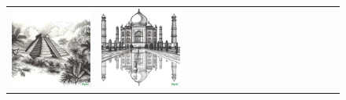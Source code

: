 \begin{figure}[ht!]
\begin{adjustwidth}{-0.8in}{-0.5in}
\begin{tabular}{cccccccccccccccccccc}
\multicolumn{3}{c}{\includegraphics[width=\twobytwocolwidth\textwidth]{figures/cherries/charcoal_pyramid.jpg}} &
\multicolumn{3}{c}{\includegraphics[width=\twobytwocolwidth\textwidth]{figures/cherries/charcoal_taj_mahal.jpg}} \\

\end{tabular}
\end{adjustwidth}
\end{figure}
